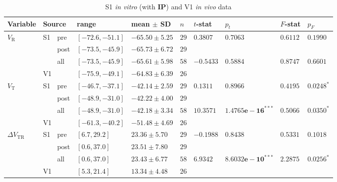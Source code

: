 \documentclass{article}
\begin{document}
\begin{table}[H]
\centering
\caption{S1 \textit{in vitro} (with \textbf{IP}) and V1 \textit{in vivo} data}
\begin{tabular}{|l|l|l|l|l|l|l|l|l|l|}
\hline Variable & \multicolumn{2}{l}{Source} & range & mean $\pm$ SD & $n$ & $t$-stat & $p_t$ & $F$-stat & $p_F$ \\
\hline
\multirow{4}{*}{$V_{\mathrm{R}}$}&\multirow{3}{*}{S1}&pre&$[-72.6, -51.1]$&$-65.50 \pm  5.25$&$29$&\multirow{2}{*}{$0.3807$}&\multirow{2}{*}{$0.7063$}&\multirow{2}{*}{$0.6112$}&\multirow{2}{*}{$0.1990$}\\
 & &post&$[-73.5, -45.9]$&$-65.73 \pm  6.72$&$29$& & & & \\
\cline{7-10} & &all&$[-73.5, -45.9]$&$-65.61 \pm  5.98$&$58$&\multirow{2}{*}{$-0.5433$}&\multirow{2}{*}{$0.5884$}&\multirow{2}{*}{$0.8747$}&\multirow{2}{*}{$0.6601$}\\
\cline{2-3} &\multicolumn{2}{l|}{V1}&$[-75.9, -49.1]$&$-64.83 \pm  6.39$&$26$& & & & \\\hline
\multirow{4}{*}{$V_{\mathrm{T}}$}&\multirow{3}{*}{S1}&pre&$[-46.7, -37.1]$&$-42.14 \pm  2.59$&$29$&\multirow{2}{*}{$0.1311$}&\multirow{2}{*}{$0.8966$}&\multirow{2}{*}{$0.4195$}&\multirow{2}{*}{$\mathbf{0.0248}^{*}$}\\
 & &post&$[-48.9, -31.0]$&$-42.22 \pm  4.00$&$29$& & & & \\
\cline{7-10} & &all&$[-48.9, -31.0]$&$-42.18 \pm  3.34$&$58$&\multirow{2}{*}{$10.3571$}&\multirow{2}{*}{$\mathbf{1.4765e-16}^{***}$}&\multirow{2}{*}{$0.5066$}&\multirow{2}{*}{$\mathbf{0.0350}^{*}$}\\
\cline{2-3} &\multicolumn{2}{l|}{V1}&$[-61.3, -40.2]$&$-51.48 \pm  4.69$&$26$& & & & \\\hline
\multirow{4}{*}{$\Delta V_{\mathrm{TR}}$}&\multirow{3}{*}{S1}&pre&$[6.7, 29.2]$&$23.36 \pm  5.70$&$29$&\multirow{2}{*}{$-0.1988$}&\multirow{2}{*}{$0.8438$}&\multirow{2}{*}{$0.5331$}&\multirow{2}{*}{$0.1018$}\\
 & &post&$[0.6, 37.0]$&$23.51 \pm  7.80$&$29$& & & & \\
\cline{7-10} & &all&$[0.6, 37.0]$&$23.43 \pm  6.77$&$58$&\multirow{2}{*}{$6.9342$}&\multirow{2}{*}{$\mathbf{8.6032e-10}^{***}$}&\multirow{2}{*}{$2.2875$}&\multirow{2}{*}{$\mathbf{0.0256}^{*}$}\\
\cline{2-3} &\multicolumn{2}{l|}{V1}&$[5.3, 21.4]$&$13.34 \pm  4.48$&$26$& & & & \\\hline
\end{tabular}
\end{table}
\end{document}
